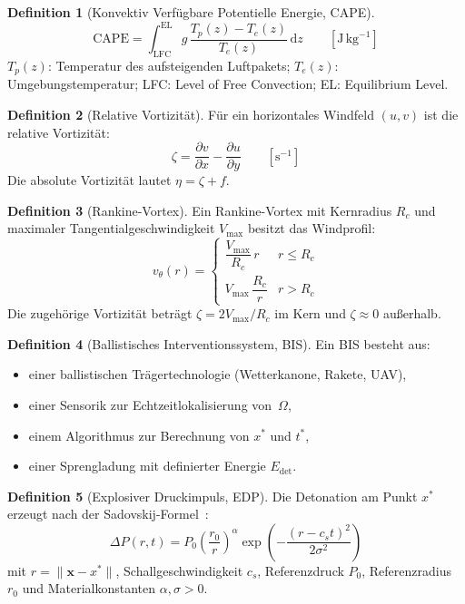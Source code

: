 ﻿\documentclass[a4paper,12pt]{article}
\theoremstyle{definition}
\newtheorem{definition}{Definition}
\begin{document}
\begin{definition}[Konvektiv Verf\"{u}gbare Potentielle Energie, CAPE]
\label{def:cape}
\[
    \mathrm{CAPE} = \int_{\mathrm{LFC}}^{\mathrm{EL}}
    g\,\frac{T_{p}(z)-T_{e}(z)}{T_{e}(z)}\,\mathrm{d}z
    \qquad[\mathrm{J\,kg}^{-1}]
\]
$T_{p}(z)$: Temperatur des aufsteigenden Luftpakets;
$T_{e}(z)$: Umgebungstemperatur;
LFC: Level of Free Convection; EL: Equilibrium Level.
\end{definition}

\begin{definition}[Relative Vortizit\"{a}t]
\label{def:vort}
F\"{u}r ein horizontales Windfeld $(u,v)$ ist die relative Vortizit\"{a}t:
\[
    \zeta = \frac{\partial v}{\partial x} - \frac{\partial u}{\partial y}
    \qquad[\mathrm{s}^{-1}]
\]
Die absolute Vortizit\"{a}t lautet $\eta=\zeta+f$.
\end{definition}

\begin{definition}[Rankine-Vortex]
\label{def:rankine}
Ein Rankine-Vortex mit Kernradius $R_{c}$ und maximaler
Tangentialgeschwindigkeit $V_{\max}$ besitzt das Windprofil:
\[
    v_{\theta}(r)=\begin{cases}
        \dfrac{V_{\max}}{R_{c}}\,r & r\leq R_{c}\\[4pt]
        V_{\max}\,\dfrac{R_{c}}{r} & r>R_{c}
    \end{cases}
\]
Die zugeh\"{o}rige Vortizit\"{a}t betr\"{a}gt $\zeta=2V_{\max}/R_{c}$ im Kern
und $\zeta\approx 0$ au\ss{}erhalb.
\end{definition}

\begin{definition}[Ballistisches Interventionssystem, BIS]
\label{def:bis}
Ein BIS besteht aus:
\begin{itemize}
    \item einer ballistischen Tr\"{a}gertechnologie (Wetterkanone, Rakete, UAV),
    \item einer Sensorik zur Echtzeitlokalisierung von~$\Omega$,
    \item einem Algorithmus zur Berechnung von $x^{*}$ und $t^{*}$,
    \item einer Sprengladung mit definierter Energie $E_{\mathrm{det}}$.
\end{itemize}
\end{definition}

\begin{definition}[Explosiver Druckimpuls, EDP]
\label{def:edp}
Die Detonation am Punkt $x^{*}$ erzeugt nach der Sadovskij-Formel~\cite{sadovskij1952}:
\[
    \Delta P(r,t) = P_{0}\left(\frac{r_{0}}{r}\right)^{\!\alpha}
    \exp\!\left(-\frac{(r-c_{s}t)^{2}}{2\sigma^{2}}\right)
\]
mit $r=\|\mathbf{x}-x^{*}\|$, Schallgeschwindigkeit $c_{s}$,
Referenzdruck $P_{0}$, Referenzradius $r_{0}$
und Material\-konstanten $\alpha,\sigma>0$.
\end{definition}
\end{document}

